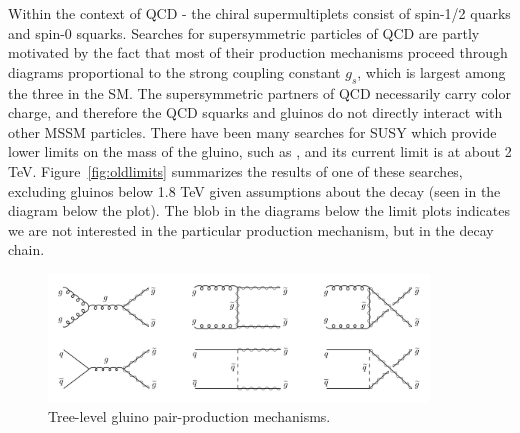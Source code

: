 Within the context of QCD - the chiral supermultiplets consist of spin-1/2 quarks and spin-0 squarks. Searches for supersymmetric particles of QCD are partly motivated by the fact that most of their production mechanisms proceed through diagrams proportional to the strong coupling constant $g_{s}$, which is largest among the three in the SM. The supersymmetric partners of QCD necessarily carry color charge, and therefore the QCD squarks and gluinos do not directly interact with other MSSM particles. There have been many searches for SUSY which provide lower limits on the mass of the gluino, such as \cite{CMS-SUS-16-033, CMS-SUS-15-002}, and its current limit is at about 2 TeV. Figure~\ref{fig:oldlimits} summarizes the results of one of these searches, excluding gluinos below 1.8 TeV given assumptions about the decay (seen in the diagram below the plot). The blob in the diagrams below the limit plots indicates we are not interested in the particular production mechanism, but in the decay chain.

\begin{figure}
\centering
\includegraphics[width=0.9\textwidth]{figs/gluinopair}
\caption{Tree-level gluino pair-production mechanisms.}
\label{fig:gluinopair}
\end{figure}

